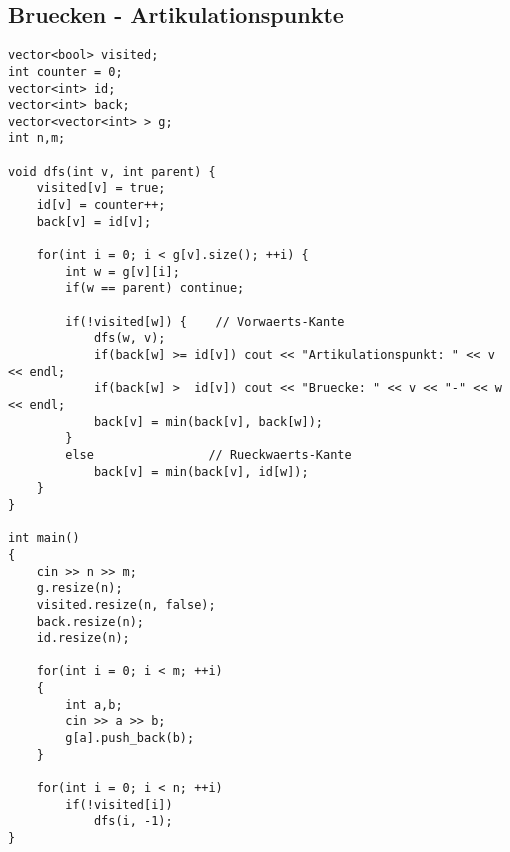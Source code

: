 \subsection{Bruecken - Artikulationspunkte}
\begin{lstlisting}
vector<bool> visited;
int counter = 0;
vector<int> id;
vector<int> back;
vector<vector<int> > g;
int n,m;

void dfs(int v, int parent) {
    visited[v] = true;
    id[v] = counter++;
    back[v] = id[v];

    for(int i = 0; i < g[v].size(); ++i) {
        int w = g[v][i];
        if(w == parent) continue;

        if(!visited[w]) {    // Vorwaerts-Kante
            dfs(w, v);
            if(back[w] >= id[v]) cout << "Artikulationspunkt: " << v << endl;
            if(back[w] >  id[v]) cout << "Bruecke: " << v << "-" << w << endl;
            back[v] = min(back[v], back[w]);
        }
        else                // Rueckwaerts-Kante
            back[v] = min(back[v], id[w]);
    }
}

int main()
{
	cin >> n >> m;
	g.resize(n);
	visited.resize(n, false);
	back.resize(n);
	id.resize(n);
	
	for(int i = 0; i < m; ++i)
	{
		int a,b;
		cin >> a >> b;
		g[a].push_back(b);
	}
	
	for(int i = 0; i < n; ++i)
		if(!visited[i])
			dfs(i, -1);
}  
\end{lstlisting}
